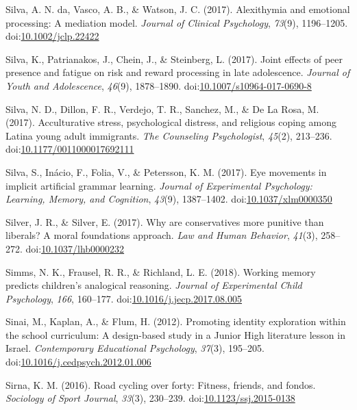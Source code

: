 \documentclass[english,man]{apa6}
\theoremstyle{definition}
\theoremstyle{definition}
\theoremstyle{definition}
\theoremstyle{remark}
\begin{document}
\hypertarget{ref-DaSilva2017}{}
Silva, A. N. da, Vasco, A. B., \& Watson, J. C. (2017). Alexithymia and
emotional processing: A mediation model. \emph{Journal of Clinical
Psychology}, \emph{73}(9), 1196--1205.
doi:\href{https://doi.org/10.1002/jclp.22422}{10.1002/jclp.22422}

\hypertarget{ref-Silva2017b}{}
Silva, K., Patrianakos, J., Chein, J., \& Steinberg, L. (2017). Joint
effects of peer presence and fatigue on risk and reward processing in
late adolescence. \emph{Journal of Youth and Adolescence}, \emph{46}(9),
1878--1890.
doi:\href{https://doi.org/10.1007/s10964-017-0690-8}{10.1007/s10964-017-0690-8}

\hypertarget{ref-Silva2017a}{}
Silva, N. D., Dillon, F. R., Verdejo, T. R., Sanchez, M., \& De La Rosa,
M. (2017). Acculturative stress, psychological distress, and religious
coping among Latina young adult immigrants. \emph{The Counseling
Psychologist}, \emph{45}(2), 213--236.
doi:\href{https://doi.org/10.1177/0011000017692111}{10.1177/0011000017692111}

\hypertarget{ref-Silva2017}{}
Silva, S., Inácio, F., Folia, V., \& Petersson, K. M. (2017). Eye
movements in implicit artificial grammar learning. \emph{Journal of
Experimental Psychology: Learning, Memory, and Cognition}, \emph{43}(9),
1387--1402.
doi:\href{https://doi.org/10.1037/xlm0000350}{10.1037/xlm0000350}

\hypertarget{ref-Silver2017}{}
Silver, J. R., \& Silver, E. (2017). Why are conservatives more punitive
than liberals? A moral foundations approach. \emph{Law and Human
Behavior}, \emph{41}(3), 258--272.
doi:\href{https://doi.org/10.1037/lhb0000232}{10.1037/lhb0000232}

\hypertarget{ref-Simms2018}{}
Simms, N. K., Frausel, R. R., \& Richland, L. E. (2018). Working memory
predicts children's analogical reasoning. \emph{Journal of Experimental
Child Psychology}, \emph{166}, 160--177.
doi:\href{https://doi.org/10.1016/j.jecp.2017.08.005}{10.1016/j.jecp.2017.08.005}

\hypertarget{ref-Sinai2012}{}
Sinai, M., Kaplan, A., \& Flum, H. (2012). Promoting identity
exploration within the school curriculum: A design-based study in a
Junior High literature lesson in Israel. \emph{Contemporary Educational
Psychology}, \emph{37}(3), 195--205.
doi:\href{https://doi.org/10.1016/j.cedpsych.2012.01.006}{10.1016/j.cedpsych.2012.01.006}

\hypertarget{ref-Sirna2016}{}
Sirna, K. M. (2016). Road cycling over forty: Fitness, friends, and
fondos. \emph{Sociology of Sport Journal}, \emph{33}(3), 230--239.
doi:\href{https://doi.org/10.1123/ssj.2015-0138}{10.1123/ssj.2015-0138}
\end{document}
